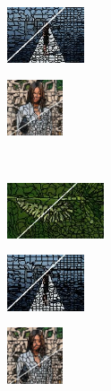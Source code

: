 \begin{figure}
	\begin{subfigure}[b]{0.129\textwidth}
		\includegraphics[height=1.65cm]{pictures/sbd/cw/cropped/cw_0004774_contours}
	\end{subfigure}
	\begin{subfigure}[b]{0.10\textwidth}
		\includegraphics[height=1.65cm]{pictures/fash/cw/cropped/cw_010_contours}
	\end{subfigure}\\
	\begin{subfigure}[b]{0.02\textwidth}
	\end{subfigure}
	\begin{subfigure}[b]{0.16\textwidth}
		\includegraphics[height=1.65cm]{pictures/bsds500/ergc/cropped/ergc_35028_contours}
	\end{subfigure}
	\begin{subfigure}[b]{0.129\textwidth}
		\includegraphics[height=1.65cm]{pictures/sbd/ergc/cropped/ergc_0004774_contours}
	\end{subfigure}
	\begin{subfigure}[b]{0.10\textwidth}
		\includegraphics[height=1.65cm]{pictures/fash/ergc/cropped/ergc_010_contours}
	\end{subfigure}
	\begin{subfigure}[b]{0.02\textwidth}

\end{subfigure}
\end{figure}
